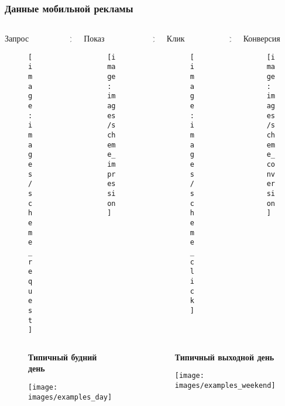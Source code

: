 \documentclass[intlimits, 9pt, unicode]{beamer}
\begin{document}
\begin{frame}
\frametitle{Данные мобильной рекламы}

   \begin{columns}
    \begin{column}{0.25\textwidth}
    \centering
     Запрос
     \begin{figure}
	\texttt{[image: images/scheme\_request]}
     \end{figure}
     \end{column}
    \begin{column}{0.001\textwidth}
    \centering
	>
     \end{column}
    \begin{column}{0.25\textwidth}
    \centering
    Показ
     \begin{figure}
	\texttt{[image: images/scheme\_impression]}
     \end{figure}
    \end{column}
    \begin{column}{0.001\textwidth}
    \centering
    >
    \end{column}
    \begin{column}{0.25\textwidth}
    \centering
    Клик
     \begin{figure}
	\texttt{[image: images/scheme\_click]}
     \end{figure}
    \end{column}
    \begin{column}{0.001\textwidth}
    \centering
    >
    \end{column}
    \begin{column}{0.25\textwidth}
    \centering
     Конверсия
     \begin{figure}
	\texttt{[image: images/scheme\_conversion]}
     \end{figure}
     \end{column}
     \end{columns}

   \begin{columns}
    \begin{column}{0.5\textwidth}
	\begin{figure}
	\textbf{Типичный будний день}\par\medskip
	\texttt{[image: images/examples\_day]}
	\end{figure}
     \end{column}
    \begin{column}{0.5\textwidth}
	\begin{figure}
	\textbf{Типичный выходной день}\par\medskip
	\texttt{[image: images/examples\_weekend]}
	\end{figure}
     \end{column}
     \end{columns}

\end{frame}
\end{document}
